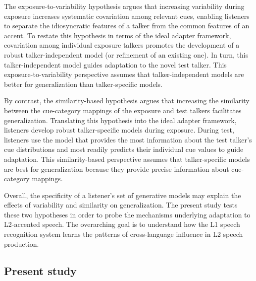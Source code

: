 \documentclass[
  preprint]{elsarticle}
\begin{document}
The exposure-to-variability hypothesis argues that increasing variability during exposure increases systematic covariation among relevant cues, enabling listeners to separate the idiosyncratic features of a talker from the common features of an accent.
To restate this hypothesis in terms of the ideal adapter framework, covariation among individual exposure talkers promotes the development of a robust talker-independent model (or refinement of an existing one).
In turn, this talker-independent model guides adaptation to the novel test talker.
This exposure-to-variability perspective assumes that talker-independent models are better for generalization than talker-specific models.

By contrast, the similarity-based hypothesis argues that increasing the similarity between the cue-category mappings of the exposure and test talkers facilitates generalization.
Translating this hypothesis into the ideal adapter framework, listeners develop robust talker-specific models during exposure.
During test, listeners use the model that provides the most information about the test talker's cue distributions and most readily predicts their individual cue values to guide adaptation.
This similarity-based perspective assumes that talker-specific models are best for generalization because they provide precise information about cue-category mappings.

Overall, the specificity of a listener's set of generative models may explain the effects of variability and similarity on generalization.
The present study tests these two hypotheses in order to probe the mechanisms underlying adaptation to L2-accented speech.
The overarching goal is to understand how the L1 speech recognition system learns the patterns of cross-language influence in L2 speech production.

\hypertarget{present-study}{%
\subsection{Present study}\label{present-study}}
\end{document}
